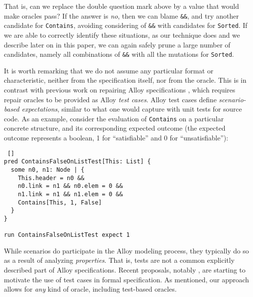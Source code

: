 \noindent
That is, can we replace the double question mark above by a value that would make oracles pass? If the answer is \emph{no}, then we can blame \texttt{\&\&}, and try another candidate for \texttt{Contains}, avoiding considering of \texttt{\&\&} with candidates for \texttt{Sorted}. If we are able to correctly identify these situations, as our technique does and we describe later on in this paper, we can again safely prune a large number of candidates, namely all combinations of \texttt{\&\&} with all the mutations for \texttt{Sorted}.

It is worth remarking that we do not assume any particular format or characteristic, neither from the specification itself, nor from the oracle. This is in contrast with previous work on repairing Alloy specifications \cite{Wang+2018}, which requires repair oracles to be provided as Alloy \emph{test cases}. Alloy test cases define \emph{scenario-based expectations}, similar to what one would capture with unit tests for source code. As an example, consider the evaluation of \texttt{Contains} on a particular concrete structure, and its corresponding expected outcome (the expected outcome represents a boolean, 1 for ``satisfiable'' and 0 for ``unsatisfiable''): 

\begin{lstlisting} []
pred ContainsFalseOnListTest[This: List] {
  some n0, n1: Node | {
    This.header = n0 &&
    n0.link = n1 && n0.elem = 0 &&
    n1.link = n1 && n1.elem = 0 &&
    Contains[This, 1, False]
  }
}

run ContainsFalseOnListTest expect 1
\end{lstlisting}

\noindent
While scenarios do participate in the Alloy modeling process, they typically do so as a result of analyzing \emph{properties}. That is, tests are not a common explicitly described part of Alloy specifications. Recent proposals, notably \cite{Sullivan+2018}, are starting to motivate the use of test cases in formal specification. As mentioned, our approach allows for \emph{any} kind of oracle, including test-based oracles. 

